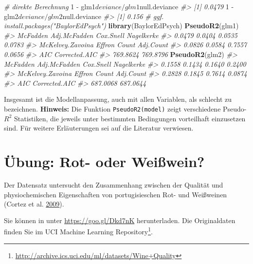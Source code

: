 \documentclass[12pt,]{book}
\newenvironment{Shaded}{\begin{snugshade}}{\end{snugshade}}
\newcommand{\KeywordTok}[1]{\textcolor[rgb]{0.13,0.29,0.53}{\textbf{{#1}}}}
\newcommand{\DecValTok}[1]{\textcolor[rgb]{0.00,0.00,0.81}{{#1}}}
\newcommand{\StringTok}[1]{\textcolor[rgb]{0.31,0.60,0.02}{{#1}}}
\newcommand{\CommentTok}[1]{\textcolor[rgb]{0.56,0.35,0.01}{\textit{{#1}}}}
\newcommand{\NormalTok}[1]{{#1}}
\let\rmarkdownfootnote\footnote%
\def\footnote{\protect\rmarkdownfootnote}
\begin{document}
\begin{Shaded}
\begin{Highlighting}[]
\CommentTok{# direkte Berechnung}
\DecValTok{1} \NormalTok{-}\StringTok{ }\NormalTok{glm1$deviance/glm1$null.deviance}
\CommentTok{#> [1] 0.0479}
\DecValTok{1} \NormalTok{-}\StringTok{ }\NormalTok{glm2$deviance/glm2$null.deviance}
\CommentTok{#> [1] 0.156}
\CommentTok{# ggf. install.packages("BaylorEdPsych")}
\KeywordTok{library}\NormalTok{(BaylorEdPsych)}
\KeywordTok{PseudoR2}\NormalTok{(glm1)}
\CommentTok{#>         McFadden     Adj.McFadden        Cox.Snell       Nagelkerke }
\CommentTok{#>           0.0479           0.0404           0.0535           0.0783 }
\CommentTok{#> McKelvey.Zavoina           Effron            Count        Adj.Count }
\CommentTok{#>           0.0826           0.0584           0.7557           0.0656 }
\CommentTok{#>              AIC    Corrected.AIC }
\CommentTok{#>         769.8624         769.8796}
\KeywordTok{PseudoR2}\NormalTok{(glm2)}
\CommentTok{#>         McFadden     Adj.McFadden        Cox.Snell       Nagelkerke }
\CommentTok{#>           0.1558           0.1434           0.1640           0.2400 }
\CommentTok{#> McKelvey.Zavoina           Effron            Count        Adj.Count }
\CommentTok{#>           0.2828           0.1845           0.7614           0.0874 }
\CommentTok{#>              AIC    Corrected.AIC }
\CommentTok{#>         687.0068         687.0644}
\end{Highlighting}
\end{Shaded}

Insgesamt ist die Modellanpassung, auch mit allen Variablen, als
schlecht zu bezeichnen. \textbf{Hinweis:} Die Funktion
\texttt{PseudoR2(model)} zeigt verschiedene Pseudo-\(R^2\) Statistiken,
die jeweils unter bestimmten Bedingungen vorteilhaft einzusetzen sind.
Für weitere Erläuterungen sei auf die Literatur verwiesen.

\section{Übung: Rot- oder Weißwein?}\label{ubung-rot--oder-weiwein}

Der Datensatz untersucht den Zusammenhang zwischen der Qualität und
physiochemischen Eigenschaften von portugisieschen Rot- und Weißweinen
(Cortez et al. \protect\hyperlink{ref-cortez2009modeling}{2009}).

Sie können in unter \url{https://goo.gl/Dkd7nK} herunterladen. Die
Originaldaten finden Sie im UCI Machine Learning Repository\footnote{\url{http://archive.ics.uci.edu/ml/datasets/Wine+Quality}}.
\end{document}
